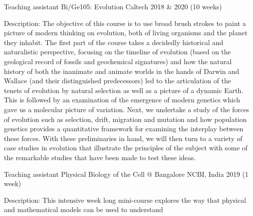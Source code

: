 

\begin{cventries}

  \cventry
    {Teaching assistant} %
    {Bi/Ge105: Evolution} %
    {Caltech} %
    {2018 \& 2020 (10 weeks)} %
    {
      \begin{cvitems} %
        \item {Description: The objective of this course is to use broad brush
        strokes to paint a picture of modern thinking on evolution, both of
        living organisms and the planet they inhabit. The first part of the
        course takes a decidedly historical and naturalistic perspective,
        focusing on the timeline of evolution (based on the geological record
        of fossils and geochemical signatures) and how the natural history of
        both the inanimate and animate worlds in the hands of Darwin and
        Wallace (and their distinguished predecessors) led to the articulation
        of the tenets of evolution by natural selection as well as a picture of
        a dynamic Earth. This is followed by an examination of the emergence of
        modern genetics which gave us a molecular picture of variation. Next,
        we undertake a study of the forces of evolution such as selection,
        drift, migration and mutation and how population genetics provides a
        quantitative framework for examining the interplay between these
        forces. With these preliminaries in hand, we will then turn to a
        variety of case studies in evolution that illustrate the principles of
        the subject with some of the remarkable studies that have been made to
        test these ideas.}
      \end{cvitems}
    }
  \cventry
    {Teaching assistant} %
    {Physical Biology of the Cell @ Bangalore} %
    {NCBI, India} %
    {2019 (1 week)} %
    {
      \begin{cvitems} %
        \item {Description: This intensive week long mini-course explores the
        way that physical and mathematical models can be used to understand
}
\end{cvitems}}
\end{cventries}
